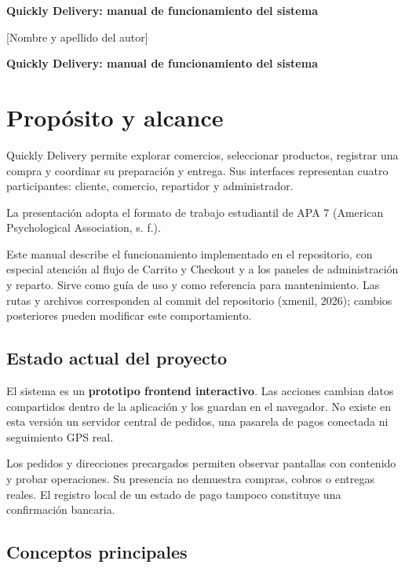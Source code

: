 \documentclass[12pt,letterpaper]{article}
\newcommand{\codigo}[1]{\texttt{\detokenize{#1}}}
\newcommand{\nombreAutor}{[Nombre y apellido del autor]}
\newcommand{\institucion}{[Departamento e institución]}
\newcommand{\asignatura}{[Código y nombre de la asignatura]}
\newcommand{\docente}{[Nombre del docente]}
\newcommand{\fechaEntrega}{[Fecha de entrega]}
\newcommand{\apaportada}{%
  \thispagestyle{fancy}
  \vspace*{1in}
  \begin{center}
    \textbf{Quickly Delivery: manual de funcionamiento del sistema}\par
    \vspace{\baselineskip}
    \nombreAutor\par
    \institucion\par
    \asignatura\par
    \docente\par
    \fechaEntrega\par
  \end{center}
}
\begin{document}
\apaportada
\clearpage
\renewcommand{\contentsname}{Índice}
\setcounter{tocdepth}{2}
\tableofcontents
\clearpage
\RaggedRight
\setlength{\parindent}{0.5in}
\begin{center}\textbf{Quickly Delivery: manual de funcionamiento del sistema}\end{center}


\section{Propósito y alcance}

Quickly Delivery permite explorar comercios, seleccionar productos, registrar una compra y coordinar su preparación y entrega. Sus interfaces representan cuatro participantes: cliente, comercio, repartidor y administrador.

La presentación adopta el formato de trabajo estudiantil de APA 7 (American Psychological Association, s. f.).

Este manual describe el funcionamiento implementado en el repositorio, con especial atención al flujo de Carrito y Checkout y a los paneles de administración y reparto. Sirve como guía de uso y como referencia para mantenimiento. Las rutas y archivos corresponden al commit \codigo{d0a8c92} del repositorio (xmenil, 2026); cambios posteriores pueden modificar este comportamiento.

\subsection{Estado actual del proyecto}

El sistema es un \textbf{prototipo frontend interactivo}. Las acciones cambian datos compartidos dentro de la aplicación y los guardan en el navegador. No existe en esta versión un servidor central de pedidos, una pasarela de pagos conectada ni seguimiento GPS real.

Los pedidos y direcciones precargados permiten observar pantallas con contenido y probar operaciones. Su presencia no demuestra compras, cobros o entregas reales. El registro local de un estado de pago tampoco constituye una confirmación bancaria.

\subsection{Conceptos principales}
\end{document}
